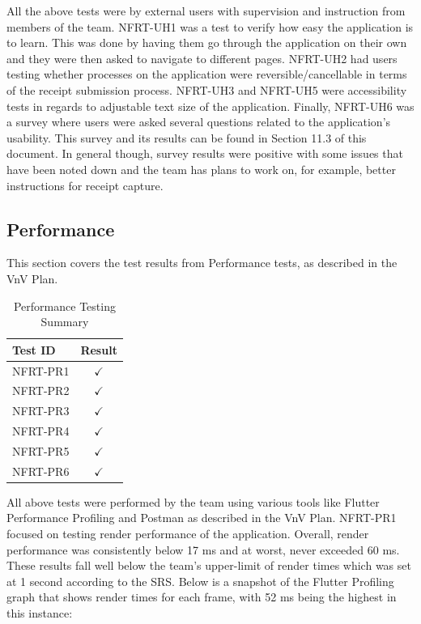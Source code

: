 \documentclass[12pt, titlepage]{article}
\begin{document}
All the above tests were by external users with supervision and instruction from members of the team. NFRT-UH1 was a test
to verify how easy the application is to learn. This was done by having them go through the application on their own
and they were then asked to navigate to different pages. NFRT-UH2 had users testing whether processes on the
application were reversible/cancellable in terms of the receipt submission process. NFRT-UH3 and NFRT-UH5 were
accessibility tests in regards to adjustable text size of the application. Finally, NFRT-UH6 was a survey where users
were asked several questions related to the application's usability. This survey and its results can be found
in Section 11.3 of this document. In general though, survey results were positive with some issues that have been noted down and
the team has plans to work on, for example, better instructions for receipt capture.
		
\subsection{Performance}

This section covers the test results from Performance tests, as described in the VnV Plan.

\begin{longtable}{|l|c|}
  \caption{Performance Testing Summary} \label{Performance Testing Summary} \\
  \toprule
  \textbf{Test ID} & \textbf{Result} \\
  \midrule
  NFRT-PR1 & $\checkmark$ \\
  \midrule
  NFRT-PR2 & $\checkmark$ \\
  \midrule
  NFRT-PR3 & $\checkmark$ \\
  \midrule
  NFRT-PR4 & $\checkmark$ \\
  \midrule
  NFRT-PR5 & $\checkmark$ \\
  \midrule
  NFRT-PR6 & $\checkmark$ \\
  \bottomrule
\end{longtable}

All above tests were performed by the team using various tools like Flutter Performance Profiling and Postman
as described in the VnV Plan. NFRT-PR1 focused on testing render performance of the application. Overall, render
performance was consistently below 17 ms and at worst, never exceeded 60 ms. These results fall well below the team's
upper-limit of render times which was set at 1 second according to the SRS. Below is a snapshot of the Flutter Profiling graph that
shows render times for each frame, with 52 ms being the highest in this instance:
\end{document}
